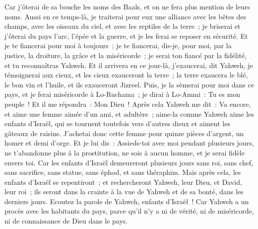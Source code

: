 \begin{multicols}{2}
Car j'ôterai de sa bouche les noms des Baals, et on ne fera plus mention de leurs noms.
Aussi en ce temps-là, je traiterai pour eux une alliance avec les bêtes des champs, avec les oiseaux du ciel, et avec les reptiles de la terre~; je briserai et j'ôterai du pays l'arc, l'épée et la guerre, et je les ferai se reposer en sécurité.
Et je te fiancerai pour moi à toujours~; je te fiancerai, dis-je, pour moi, par la justice, la droiture, la grâce et la miséricorde~;
je serai ton fiancé par la fidélité, et tu reconnaîtras Yahweh.
Et il arrivera en ce jour-là, j'exaucerai, dit Yahweh, je témoignerai aux cieux, et les cieux exauceront la terre~;
la terre exaucera le blé, le bon vin et l'huile, et ils exauceront Jizreel. 
Puis, je la sèmerai pour moi dans ce pays, et je ferai miséricorde à Lo-Ruchama~; je dirai à Lo-Ammi~: Tu es mon peuple~! Et il me répondra~: Mon Dieu~!
\VerseOne{}Après cela Yahweh me dit~: Va encore, et aime une femme aimée d'un ami, et adultère~; aime-la comme Yahweh aime les enfants d'Israël, qui se tournent toutefois vers d'autres dieux et aiment les gâteaux de raisins.
J'achetai donc cette femme pour quinze pièces d'argent, un homer et demi d'orge.
Et je lui dis~: Assieds-toi avec moi pendant plusieurs jours, ne t'abandonne plus à la prostitution, ne sois à aucun homme, et je serai fidèle envers toi.
Car les enfants d'Israël demeureront plusieurs jours sans roi, sans chef, sans sacrifice, sans statue, sans éphod, et sans théraphim.
Mais après cela, les enfants d'Israël se repentiront~; et rechercheront Yahweh, leur Dieu, et David, leur roi~; ils seront dans la crainte à la vue de Yahweh et de sa bonté, dans les derniers jours.
\VerseOne{}Ecoutez la parole de Yahweh, enfants d'Israël~! Car Yahweh a un procès avec les habitants du pays, parce qu'il n'y a ni de vérité, ni de miséricorde, ni de connaissance de Dieu dans le pays.

\end{multicols}
